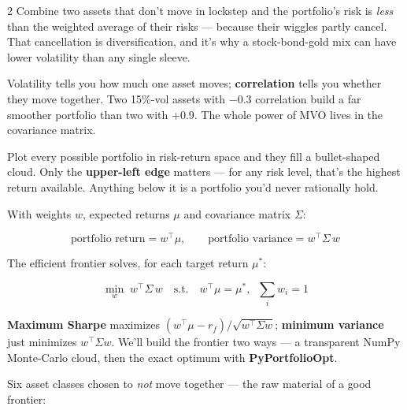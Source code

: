 \documentclass{pyportfolios-note}
\begin{document}
\begin{multicols}{2}
Combine two assets that don't move in lockstep and the portfolio's risk is
\textit{less} than the weighted average of their risks — because their wiggles
partly cancel. That cancellation is diversification, and it's why a
stock-bond-gold mix can have lower volatility than any single sleeve.

Volatility tells you how much one asset moves; \textbf{correlation} tells you
whether they move together. Two 15\%-vol assets with −0.3 correlation build a
far smoother portfolio than two with +0.9. The whole power of MVO lives in the
covariance matrix.

Plot every possible portfolio in risk-return space and they fill a bullet-shaped
cloud. Only the \textbf{upper-left edge} matters — for any risk level, that's
the highest return available. Anything below it is a portfolio you'd never
rationally hold.
\end{multicols}

\noteneedroom{180bp}

With weights $w$, expected returns $\mu$ and covariance matrix $\Sigma$:

\[ \text{portfolio return} = w^\top \mu, \qquad
   \text{portfolio variance} = w^\top \Sigma\, w \]

The efficient frontier solves, for each target return $\mu^*$:

\[ \min_w\; w^\top \Sigma\, w \quad\text{s.t.}\quad
   w^\top \mu = \mu^*,\;\; \sum_i w_i = 1 \]

\textbf{Maximum Sharpe} maximizes $(w^\top\mu - r_f)/\sqrt{w^\top\Sigma w}$;
\textbf{minimum variance} just minimizes $w^\top\Sigma w$. We'll build the
frontier two ways — a transparent NumPy Monte-Carlo cloud, then the exact
optimum with \textbf{PyPortfolioOpt}.

\noteneedroom{200bp}


Six asset classes chosen to \textit{not} move together — the raw material of a
good frontier:
\end{document}
